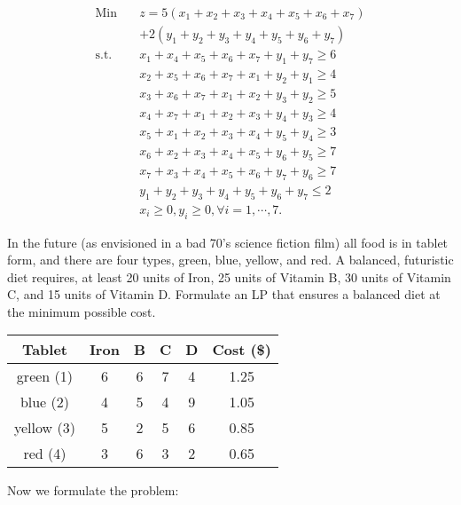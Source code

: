 \begin{align*}
\mbox{Min~~ } & z = 5(x_1 + x_2 + x_3 + x_4 + x_5 + x_6 + x_7) \\
& + 2(y_1 + y_2 + y_3 + y_4 + y_5 + y_6 + y_7) \nonumber \\
\mbox{s.t.~~} & x_1 + x_4 + x_5 + x_6 + x_7 + y_1 + y_7 \ge 6 \\
& x_2 + x_5 + x_6 + x_7 + x_1 + y_2 + y_1 \ge 4 \\
&           x_3 + x_6 + x_7 + x_1 + x_2 + y_3 + y_2 \ge 5 \\
&           x_4 + x_7 + x_1 + x_2 + x_3 + y_4 + y_3 \ge 4 \\
&           x_5 + x_1 + x_2 + x_3 + x_4 + y_5 + y_4 \ge 3 \\
&           x_6 + x_2 + x_3 + x_4 + x_5 + y_6 + y_5 \ge 7 \\
&           x_7 + x_3 + x_4 + x_5 + x_6 + y_7 + y_6 \ge 7 \\
&           y_1 + y_2 + y_3 + y_4 + y_5 + y_6 + y_7 \le 2 \\
&           x_i \ge 0, y_i \ge 0, \forall i = 1,\cdots,7.
\end{align*}

 In the future (as envisioned in a bad 70's science fiction film) all food is in tablet form, and there are four types, green, blue, yellow, and red. A balanced, futuristic diet requires, at least 20 units of Iron, 25 units of Vitamin B, 30 units of Vitamin C, and 15 units of Vitamin D. Formulate an LP that ensures a balanced diet at the minimum possible cost.

\begin{table}[h!] \begin{center} \begin{tabular} {|c|c|c|c|c|c|}
\hline Tablet  & Iron &  B &  C  &  D & Cost (\$) \\ \hline
\hline  green (1)  & 6    & 6  & 7          & 4        &  1.25 \\
\hline  blue (2)  & 4    & 5  & 4          & 9        &  1.05 \\
\hline  yellow (3) & 5    & 2  & 5          & 6        &  0.85 \\
\hline  red (4)   & 3    & 6  & 3          & 2        &  0.65 \\ \hline
\end{tabular} \end{center} \end{table}

Now we formulate the problem:

